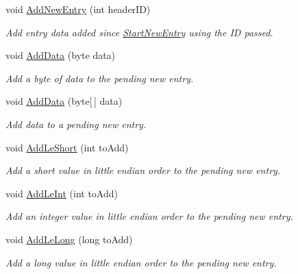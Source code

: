 \begin{DoxyCompactItemize}
void \hyperlink{class_i_c_sharp_code_1_1_sharp_zip_lib_1_1_zip_1_1_zip_extra_data_aba673aeb5ed08038a5c76377c0607ca9}{Add\+New\+Entry} (int header\+ID)
\begin{DoxyCompactList}\small\item\em Add entry data added since \hyperlink{class_i_c_sharp_code_1_1_sharp_zip_lib_1_1_zip_1_1_zip_extra_data_a3fd5ac216b1b6a0fe5ae92ea8156f20a}{Start\+New\+Entry} using the ID passed. \end{DoxyCompactList}\item 
void \hyperlink{class_i_c_sharp_code_1_1_sharp_zip_lib_1_1_zip_1_1_zip_extra_data_a5a4382d76458422b6e5c9c353430eaa8}{Add\+Data} (byte data)
\begin{DoxyCompactList}\small\item\em Add a byte of data to the pending new entry. \end{DoxyCompactList}\item 
void \hyperlink{class_i_c_sharp_code_1_1_sharp_zip_lib_1_1_zip_1_1_zip_extra_data_aadf236a3ef6fc9c6a033ca14f931734c}{Add\+Data} (byte\mbox{[}$\,$\mbox{]} data)
\begin{DoxyCompactList}\small\item\em Add data to a pending new entry. \end{DoxyCompactList}\item 
void \hyperlink{class_i_c_sharp_code_1_1_sharp_zip_lib_1_1_zip_1_1_zip_extra_data_acc356859af6fe44b71ca605473385dec}{Add\+Le\+Short} (int to\+Add)
\begin{DoxyCompactList}\small\item\em Add a short value in little endian order to the pending new entry. \end{DoxyCompactList}\item 
void \hyperlink{class_i_c_sharp_code_1_1_sharp_zip_lib_1_1_zip_1_1_zip_extra_data_ac688733a0684d0e2a32da357d444212a}{Add\+Le\+Int} (int to\+Add)
\begin{DoxyCompactList}\small\item\em Add an integer value in little endian order to the pending new entry. \end{DoxyCompactList}\item 
void \hyperlink{class_i_c_sharp_code_1_1_sharp_zip_lib_1_1_zip_1_1_zip_extra_data_aafc11e296c9769e11ddfbc07dee754e7}{Add\+Le\+Long} (long to\+Add)
\begin{DoxyCompactList}\small\item\em Add a long value in little endian order to the pending new entry. \end{DoxyCompactList}\item 

\end{DoxyCompactItemize}
